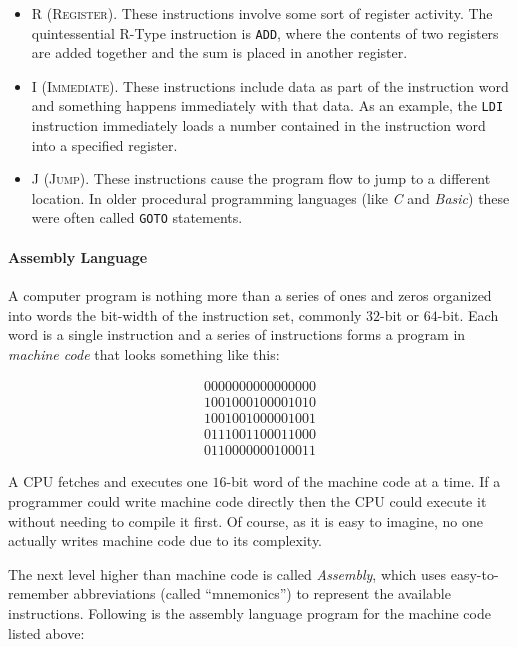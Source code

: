 \begin{itemize}
  \item \textsc{R (Register)}. These instructions involve some sort of register activity. The quintessential R-Type instruction is \lstinline[columns=fixed]|ADD|, where the contents of two registers are added together and the sum is placed in another register.
  \item \textsc{I (Immediate)}. These instructions include data as part of the instruction word and something happens immediately with that data. As an example, the \lstinline[columns=fixed]|LDI| instruction immediately loads a number contained in the instruction word into a specified register.
  \item \textsc{J (Jump)}. These instructions cause the program flow to jump to a different location. In older procedural programming languages (like \emph{C} and \emph{Basic}) these were often called \lstinline[columns=fixed]|GOTO| statements.
\end{itemize}

\paragraph{Assembly Language} A computer program is nothing more than a series of ones and zeros organized into words the bit-width of the instruction set,  commonly $ 32 $-bit or $ 64 $-bit. Each word is a single instruction and a series of instructions forms a program in \emph{machine code} that looks something like this:

\begin{align}
  \label{SIM:eq:sample_machine_code}
  0000 0000 0000 0000\\
  \nonumber
  1001 0001 0000 1010\\
  \nonumber
  1001 0010 0000 1001\\
  \nonumber
  0111 0011 0001 1000\\
  \nonumber
  0110 0000 0010 0011
\end{align}

A \ac{CPU} fetches and executes one $ 16 $-bit word of the machine code at a time. If a programmer could write machine code directly then the \ac{CPU} could execute it without needing to compile it first. Of course, as it is easy to imagine, no one actually writes machine code due to its complexity. 

The next level higher than machine code is called \emph{Assembly}, which uses easy-to-remember abbreviations (called ``mnemonics'') to represent the available  instructions. Following is the assembly language program for the machine code listed above:

